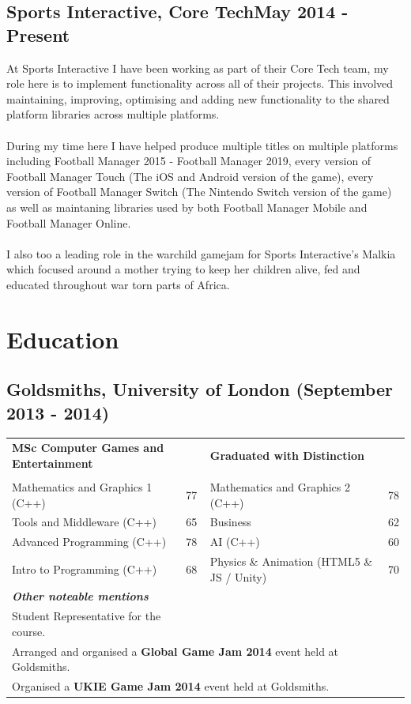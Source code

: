 \documentclass{article}
\begin{document}
\subsection*{Sports Interactive, Core Tech\hfill \textbf{May 2014 - Present}}
At Sports Interactive I have been working as part of their Core Tech team, my role here is to implement functionality across all of their projects. This involved maintaining, improving, optimising and adding new functionality to the shared platform libraries across multiple platforms.
\\\\During my time here I have helped produce multiple titles on multiple platforms including Football Manager 2015 - Football Manager 2019, every version of Football Manager Touch (The iOS and Android version of the game), every version of Football Manager Switch (The Nintendo Switch version of the game) as well as maintaning libraries used by both Football Manager Mobile and Football Manager Online.
\\\\I also too a leading role in the warchild gamejam for Sports Interactive's Malkia which focused around a mother trying to keep her children alive, fed and educated throughout war torn parts of Africa.

\section*{Education}
\subsection*{Goldsmiths, University of London (September 2013 - 2014)}
\begin{tabular}{ p{} p{} p{} p{} }
	\multicolumn{2}{l}{\textbf{MSc Computer Games and Entertainment}} & \textbf{Graduated with Distinction} \\ \\
	Mathematics and Graphics 1 (C++) & 77 &	Mathematics and Graphics 2 (C++) & 78 \\
	Tools and Middleware (C++) & 65	& Business & 62 \\
	Advanced Programming (C++) & 78	& AI (C++) & 60 \\
	Intro to Programming (C++) & 68	& Physics \& Animation (HTML5 \& JS / Unity) & 70 \\
	\bf{\emph{Other noteable mentions}} \\
	Student Representative for the course. \\
	\multicolumn{4}{l}{Arranged and organised a {\bf \large Global Game Jam 2014} event held at Goldsmiths.} \\
	\multicolumn{4}{l}{Organised a {\bf \large UKIE Game Jam 2014} event held at Goldsmiths.} \\
\end{tabular}\\ 
\newpage
\end{document}
